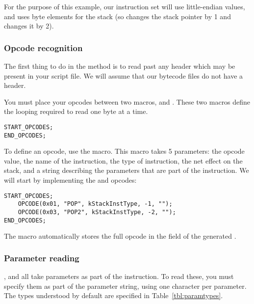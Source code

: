For the purpose of this example, our instruction set will use little-endian values, and uses byte elements for the stack (so  changes the stack pointer by 1 and  changes it by 2).

\subsubsection{Opcode recognition}
The first thing to do in the  method is to read past any header which may be present in your script file. We will assume that our bytecode files do not have a header.

You must place your opcodes between two macros,  and . These two macros define the looping required to read one byte at a time.

\begin{C++}
\begin{lstlisting}
START_OPCODES;
END_OPCODES;
\end{lstlisting}
\end{C++}

To define an opcode, use the  macro. This macro takes 5 parameters: the opcode value, the name of the instruction, the type of instruction, the net effect on the stack, and a string describing the parameters that are part of the instruction. We will start by implementing the  and  opcodes:

\begin{C++}
\begin{lstlisting}
START_OPCODES;
	OPCODE(0x01, "POP", kStackInstType, -1, "");
	OPCODE(0x03, "POP2", kStackInstType, -2, "");
END_OPCODES;
\end{lstlisting}
\end{C++}

The  macro automatically stores the full opcode in the  field of the generated .

\subsubsection{Parameter reading}
,  and  all take parameters as part of the instruction. To read these, you must specify them as part of the parameter string, using one character per parameter. The types understood by default are specified in Table~\vref{tbl:paramtypes}.

